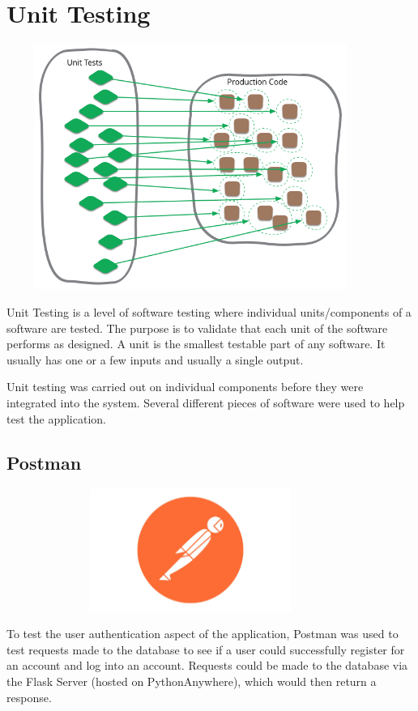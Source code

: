 \section{Unit Testing}
\begin{center}
    \includegraphics[width=12cm,height=8cm,keepaspectratio]{images/unit}
\end{center}
Unit Testing is a level of software testing where individual units/components
of a software are tested. The purpose is to validate that each unit of the
software performs as designed. A unit is the smallest testable part of any 
software. It usually has one or a few inputs and usually a single output.
\par
\bigskip
Unit testing was carried out on individual components before they were integrated into the system. Several different pieces of software were used to help test the application.

\subsection{Postman}
\begin{center}
    \includegraphics[width=12cm,height=4cm,keepaspectratio]{images/postman}
\end{center}
To test the user authentication aspect of the application, Postman was used to test requests made to the database to see if a user could successfully register for an account and log into an account. Requests could be made to the database via the Flask Server (hosted on PythonAnywhere), which would then return a response.


